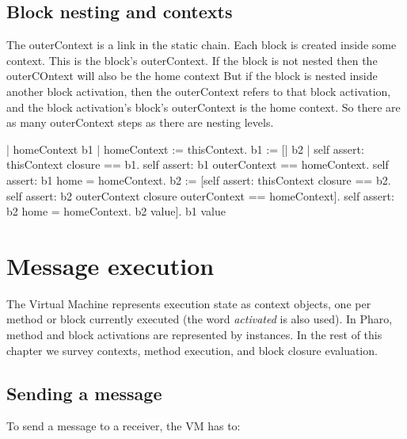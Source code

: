 \documentclass[a4paper,10pt,twoside]{book}
\begin{document}
\subsection{Block nesting and contexts}
The outerContext is a link in the static chain.  Each block is created inside some context.  This is the block's outerContext.  If the block is not nested then the outerCOntext will also be the home context  But if the block is nested inside another block activation, then the outerContext refers to that block activation, and the block activation's block's outerContext is the home context.  So there are as many outerContext steps as there are nesting levels.


\begin{code}{}
| homeContext b1 |
homeContext := thisContext.
b1 := [| b2 |
          self assert: thisContext closure == b1.
          self assert: b1 outerContext == homeContext.
	    self assert: b1 home = homeContext.
          b2 := [self assert: thisContext closure == b2.
                    self assert: b2 outerContext closure outerContext == homeContext].
			  self assert: b2 home = homeContext.
          b2 value].
b1 value 
\end{code}


\section{Message execution}

The Virtual Machine represents execution state as context objects, one per method or block currently executed (the word \emph{activated} is also used). In Pharo, method and block activations are represented by  instances.
In the rest of this chapter we survey contexts, method execution, and block closure evaluation.

\subsection{Sending a message}

To send a message to a receiver, the VM has to:
\end{document}
